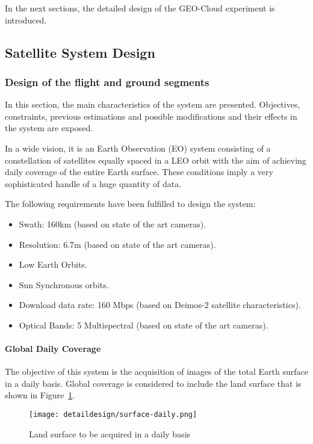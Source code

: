 In the next sections, the detailed design of the GEO-Cloud experiment is introduced.

\subsection{Satellite System Design}
\label{subsec:system-design}
\subsubsection{Design of the flight and ground segments}
\label{subsubsec:design-flight-ground}
In this section, the main characteristics of the system are presented. Objectives, constraints, previous estimations and possible modifications and their effects in the system are exposed.

In a wide vision, it is an Earth Observation (EO) system consisting of a constellation of satellites equally spaced in a \acs{LEO} orbit with the aim of achieving daily coverage of the entire Earth surface. These conditions imply a very sophisticated handle of a huge quantity of data.

The following requirements have been fulfilled to design the system:
\begin{itemize}
\item Swath: 160km (based on state of the art cameras).
\item Resolution: 6.7m (based on state of the art cameras).
\item Low Earth Orbits.
\item Sun Synchronous orbits. 
\item Download data rate: 160 Mbps (based on Deimos-2 satellite characteristics).
\item Optical Bands: 5 Multispectral (based on state of the art cameras).
\end{itemize}

\paragraph{Global Daily Coverage}
The objective of this system is the acquisition of images of the total Earth surface in a daily basis. Global coverage is considered to include the land surface that is shown in Figure~\ref{fig:intr-land-surface}.


\begin{figure}[!h]
\begin{center}
\texttt{[image: detaildesign/surface-daily.png]}
\caption{Land surface to be acquired in a daily basis}
\label{fig:intr-land-surface}
\end{center}
\end{figure}

